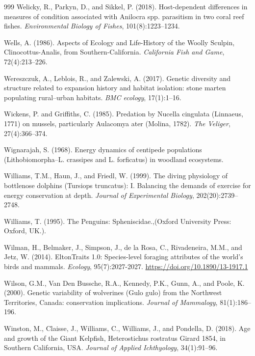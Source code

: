 \begin{thebibliography}{999}
Welicky, R., Parkyn, D., and Sikkel, P. (2018). Host-dependent differences in measures of condition associated with Anilocra spp. parasitism in two coral reef fishes. \textit{Environmental Biology of Fishes}, 101(8):1223--1234.

Wells, A. (1986). Aspects of Ecology and Life-History of the Woolly Sculpin, Clinocottus-Analis, from Southern-California. \textit{California Fish and Game}, 72(4):213--226.

Wereszczuk, A., Leblois, R., and Zalewski, A. (2017). Genetic diversity and structure related to expansion history and habitat isolation: stone marten populating rural--urban habitats. \textit{BMC ecology}, 17(1):1--16.

Wickens, P. and Griffiths, C. (1985). Predation by Nucella cingulata (Linnaeus, 1771) on mussels, particularly Aulacomya ater (Molina, 1782). \textit{The Veliger}, 27(4):366--374.

Wignarajah, S. (1968). Energy dynamics of centipede populations (Lithobiomorpha--L. crassipes and L. forficatus) in woodland ecosystems.

Williams, T.M., Haun, J., and Friedl, W. (1999). The diving physiology of bottlenose dolphins (Tursiops truncatus): I. Balancing the demands of exercise for energy conservation at depth. \textit{Journal of Experimental Biology}, 202(20):2739--2748.

Williams, T. (1995). The Penguins: Spheniscidae.,(Oxford University Press: Oxford, UK.).

Wilman, H., Belmaker, J., Simpson, J., de la Rosa, C., Rivadeneira, M.M., and Jetz, W. (2014). EltonTraits 1.0: Species-level foraging attributes of the world's birds and mammals. \textit{Ecology}, 95(7):2027-2027. \url{https://doi.org/10.1890/13-1917.1}

Wilson, G.M., Van Den Bussche, R.A., Kennedy, P.K., Gunn, A., and Poole, K. (2000). Genetic variability of wolverines (Gulo gulo) from the Northwest Territories, Canada: conservation implications. \textit{Journal of Mammalogy}, 81(1):186--196.

Winston, M., Claisse, J., Williams, C., Williams, J., and Pondella, D. (2018). Age and growth of the Giant Kelpfish, Heterostichus rostratus Girard 1854, in Southern California, USA. \textit{Journal of Applied Ichthyology}, 34(1):91--96.


\end{thebibliography}
